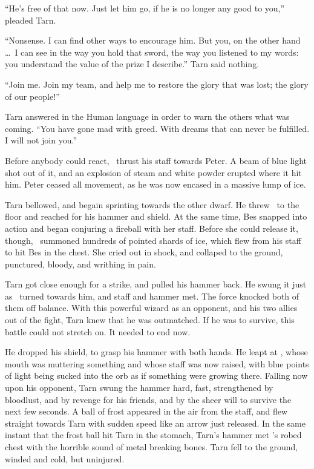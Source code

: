 ``He's free of that now.  Just let him go, if he is no longer any good to you,'' pleaded Tarn.

``Nonsense.  I can find other ways to encourage him.  But you, on the other hand \ldots\ I can see in the way you hold that sword, the way you listened to my words: you understand the value of the prize I describe.''  Tarn said nothing.

``Join me.  Join my team, and help me to restore the glory that was lost; the glory of our people!''

Tarn answered in the Human language in order to warn the others what was coming.  ``You have gone mad with greed.  With dreams that can never be fulfilled.  I will not join you.''

Before anybody could react, \mothzam\ thrust his staff towards Peter.  A beam of blue light shot out of it, and an explosion of steam and white powder erupted where it hit him.  Peter ceased all movement, as he was now encased in a massive lump of ice.

Tarn bellowed, and begain sprinting towards the other dwarf.  He threw \kildir\ to the floor and reached for his hammer and shield.  At the same time, Bes snapped into action and began conjuring a fireball with her staff.  Before she could release it, though, \mothzam\ summoned hundreds of pointed shards of ice, which flew from his staff to hit Bes in the chest.  She cried out in shock, and collaped to the ground, punctured, bloody, and writhing in pain.

Tarn got close enough for a strike, and pulled his hammer back.  He swung it just as \mothzam\ turned towards him, and staff and hammer met.  The force knocked both of them off balance.  With this powerful wizard as an opponent, and his two allies out of the fight, Tarn knew that he was outmatched.  If he was to survive, this battle could not stretch on.  It needed to end now.

He dropped his shield, to grasp his hammer with both hands.  He leapt at \mothzam, whose mouth was muttering something and whose staff was now raised, with blue points of light being sucked into the orb as if something were growing there.  Falling now upon his opponent, Tarn swung the hammer hard, fast, strengthened by bloodlust, and by revenge for his friends, and by the sheer will to survive the next few seconds.  A ball of frost appeared in the air from the staff, and flew straight towards Tarn with sudden speed like an arrow just released.  In the same instant that the frost ball hit Tarn in the stomach, Tarn's hammer met \mothzam's robed chest with the horrible sound of metal breaking bones.  Tarn fell to the ground, winded and cold, but uninjured.

